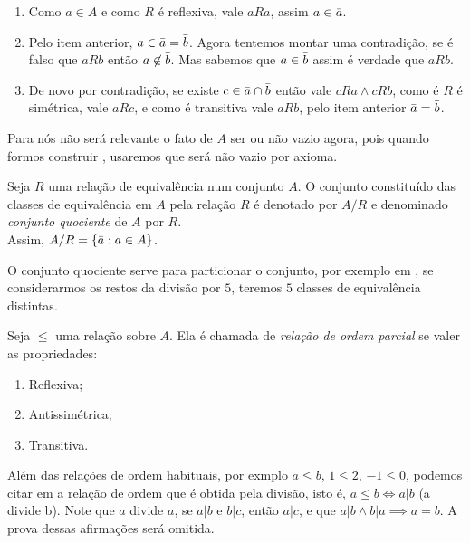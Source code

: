 \documentclass[../main.tex]{subfiles}
\begin{document}
\begin{dem}
    \begin{enumerate}[label=(\roman*)]
        \item Como $a \in A$ e como $R$ é reflexiva, vale $aRa$, assim $a \in \Bar{a}$.
        \item Pelo item anterior, $a \in \Bar{a} = \Bar{b}$. 
        Agora tentemos montar uma contradição, se é falso que $aRb$ então $a \not\in \Bar{b}$. Mas sabemos que $a \in \Bar{b}$ assim é verdade que $aRb$.
        \item De novo por contradição, se existe $c \in \Bar{a} \cap \Bar{b}$ então vale $cRa \land cRb$, como é $R$ é simétrica, vale $aRc$, e como é transitiva vale $aRb$, pelo item anterior $\Bar{a} = \Bar{b}$.
    \end{enumerate}
\end{dem}
Para nós não será relevante o fato de $A$ ser ou não vazio agora, pois quando formos construir \Z, usaremos \N que será não vazio por axioma.

\begin{defi}\label{agb-def-conjQuoc}
    Seja $R$ uma relação de equivalência num conjunto $A$. O conjunto constituído das classes de equivalência em $A$ pela relação $R$ é denotado por $A / R$ e denominado \emph{conjunto quociente} de $A$ por $R$. \\
    Assim, $A / R = \{\Bar{a} : a \in A\}$.
\end{defi}
O conjunto quociente serve para particionar o conjunto, por exemplo em \Z, se considerarmos os restos da divisão por $5$, teremos $5$ classes de equivalência distintas.

\begin{defi}\label{agb-def-relOrd}
    Seja $\leq$ uma relação sobre $A$. Ela é chamada de \emph{relação de ordem parcial} se valer as propriedades:
    \begin{enumerate}[label=(\roman*)]
        \item Reflexiva;
        \item Antissimétrica;
        \item Transitiva.
    \end{enumerate}
\end{defi}

Além das relações de ordem habituais, por exmplo $a \leq b$, $1 \leq 2$, $-1 \leq 0$, podemos citar em \N a relação de ordem que é obtida pela divisão, isto é, $a \leq b \iff a | b$ (a divide b). Note que $a$ divide $a$, se $a | b$ e $b | c$, então $a | c$, e que $a | b \land b | a \implies a=b$. A prova dessas afirmações será omitida.
\end{document}
